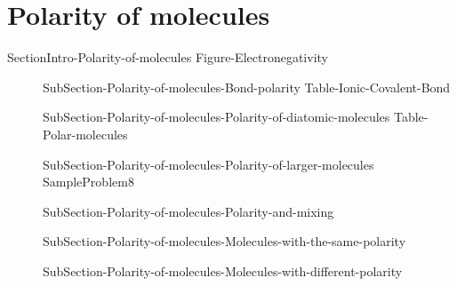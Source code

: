 \documentclass[main.tex]{subfiles}
\newcommand\chapterlabel{Ch-naming}\setcounter{figurenewcounter}{0}\setcounter{tablenewcounter}{0}\setcounter{formulanewcounter}{0}\chapterpicture{../{\chapterlabel}/figure1}\chapterpicturelabel{Pixnio}
\begin{document}
{\section{Polarity of molecules}{SectionIntro-Polarity-of-molecules}
{Figure-Electronegativity}	
\sloppy \begin{description}
\item[] {SubSection-Polarity-of-molecules-Bond-polarity}
{Table-Ionic-Covalent-Bond}
\item[] {SubSection-Polarity-of-molecules-Polarity-of-diatomic-molecules}
{Table-Polar-molecules}
\item[] {SubSection-Polarity-of-molecules-Polarity-of-larger-molecules}
{SampleProblem8}
\item[] {SubSection-Polarity-of-molecules-Polarity-and-mixing}
\item[] {SubSection-Polarity-of-molecules-Molecules-with-the-same-polarity}
\item[] {SubSection-Polarity-of-molecules-Molecules-with-different-polarity}
\end{description}


\renewcommand\chapterlabel{Ch-Solids}


}
\end{document}
